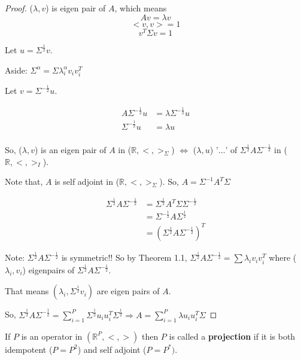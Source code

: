 \documentclass[11pt,fleqn]{book} %
\begin{document}
\begin{proof}
	($\lambda, v$) is eigen pair of $A$, which means
	 	$$Av = \lambda v $$
	 	$$<v,v> = 1$$
	 	$$v^T\Sigma v = 1$$

	  Let $u = \Sigma^{\frac{1}{2}} v$. 

\begin{remark}
		Aside: $\Sigma^\alpha = \Sigma \lambda_i^\alpha v_i v_i^T$

\end{remark}


	Let $v = \Sigma^{-\frac{1}{2}} u$.

	\begin{align*}
		A \Sigma^{-\frac{1}{2}} u &= \lambda \Sigma^{-\frac{1}{2}} u\\
		\Sigma^{-\frac{1}{2}} u &= \lambda u\\
	\end{align*}

So, ($\lambda, v$) is  an eigen pair of $A$ in ($\mathbb{R}, <,>_\Sigma$) $\Leftrightarrow$ ($\lambda, u$) '$\dots$' of $\Sigma^{\frac{1}{2}} A \Sigma^{-\frac{1}{2}}$ in ($\mathbb{R}, <,>_I$).

Note that, $A$ is self adjoint in ($\mathbb{R}, <,>_\Sigma$). So, $A = \Sigma^{-1} A^T \Sigma$

\begin{align*}
	\Sigma^{\frac{1}{2}} A \Sigma^{- \frac{1}{2}} &= \Sigma^{\frac{1}{2}} A^T \Sigma \Sigma^{-\frac{1}{2}}\\
	&= \Sigma^{-\frac{1}{2}} A \Sigma^{\frac{1}{2}} \\
	&= (\Sigma^{\frac{1}{2}} A \Sigma^{-\frac{1}{2}})^T
\end{align*}

Note: $\Sigma^{\frac{1}{2}} A \Sigma^{-\frac{1}{2}}$ is symmetric!! So by Theorem 1.1, $\Sigma^{\frac{1}{2}} A \Sigma^{-\frac{1}{2}} = \sum \lambda_i v_i v_i^T$ where ($\lambda_i, v_i$) eigenpairs of $\Sigma^{\frac{1}{2}} A \Sigma^{-\frac{1}{2}}$. 

That means $(\lambda_i, \Sigma^{\frac{1}{2}} v_i)$ are eigen pairs of $A$. 

So, $\Sigma^{\frac{1}{2}} A \Sigma^{-\frac{1}{2}} = \displaystyle \sum ^P_{i=1} \Sigma^{\frac{1}{2}} u_i u_i^T \Sigma^{\frac{1}{2}} \Rightarrow A = \displaystyle \sum ^P_{i=1} \lambda u_i u_i^T \Sigma$ 
\end{proof}


\begin{definition}[Projection]
	If $P$ is an operator in $(\mathbb{R}^{P}, <,>)$ then $P$ is called a \textbf{projection} if it is both idempotent ($P = P^2$) and self adjoint ($P = P^*)$. 
\end{definition}
\end{document}
